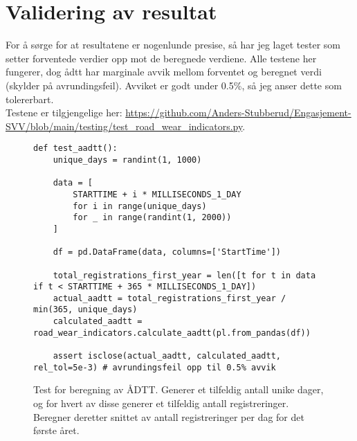 \section{Validering av resultat}
For å sørge for at resultatene er nogenlunde presise, så har jeg laget tester som setter forventede verdier opp mot de beregnede verdiene.
Alle testene her fungerer, dog ådtt har marginale avvik mellom forventet og beregnet verdi (skylder på avrundingsfeil). Avviket er godt under 0.5\%, 
så jeg anser dette som tolererbart.\\
Testene er tilgjengelige her: \url{https://github.com/Anders-Stubberud/Engasjement-SVV/blob/main/testing/test_road_wear_indicators.py}.

\begin{figure}[ht]
\centering
\scriptsize
\begin{lstlisting}
def test_aadtt():
    unique_days = randint(1, 1000)

    data = [
        STARTTIME + i * MILLISECONDS_1_DAY
        for i in range(unique_days)
        for _ in range(randint(1, 2000))
    ]

    df = pd.DataFrame(data, columns=['StartTime'])
    
    total_registrations_first_year = len([t for t in data if t < STARTTIME + 365 * MILLISECONDS_1_DAY])
    actual_aadtt = total_registrations_first_year / min(365, unique_days)
    calculated_aadtt = road_wear_indicators.calculate_aadtt(pl.from_pandas(df))

    assert isclose(actual_aadtt, calculated_aadtt, rel_tol=5e-3) # avrundingsfeil opp til 0.5% avvik
\end{lstlisting}
\caption{Test for beregning av ÅDTT. Generer et tilfeldig antall unike dager, og for hvert av disse generer et tilfeldig antall registreringer. Beregner deretter snittet av antall registreringer per dag for det første året.}
\end{figure}

